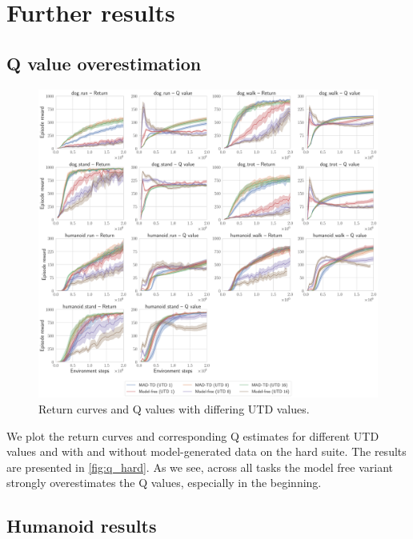 \newpage

\section{Further results}
\label{app:results}

\subsection{Q value overestimation}
\label{app:results_q}
\begin{figure}[ht]
    \centering
    \includegraphics[width=\linewidth]{figures/mad-td/q_values_utd.pdf}
    \caption{Return curves and Q values with differing UTD values.}
    \label{fig:q_hard}
\end{figure}


We plot the return curves and corresponding Q estimates for different UTD values and with and without model-generated data on the hard suite.
The results are presented in \autoref{fig:q_hard}.
As we see, across all tasks the model free variant strongly overestimates the Q values, especially in the beginning.

\newpage

\subsection{Humanoid results}
\label{app:results_hum}


